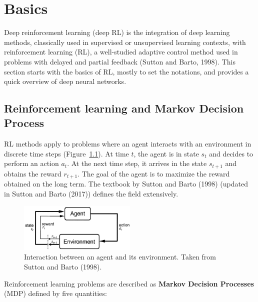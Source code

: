 \documentclass[
  letterpaper,
  DIV=11,
  numbers=noendperiod]{scrreprt}
\begin{document}
\hypertarget{basics}{%
\chapter{Basics}\label{basics}}

Deep reinforcement learning (deep RL) is the integration of deep
learning methods, classically used in supervised or unsupervised
learning contexts, with reinforcement learning (RL), a well-studied
adaptive control method used in problems with delayed and partial
feedback (Sutton and Barto, 1998). This section starts with the basics
of RL, mostly to set the notations, and provides a quick overview of
deep neural networks.

\hypertarget{reinforcement-learning-and-markov-decision-process}{%
\section{Reinforcement learning and Markov Decision
Process}\label{reinforcement-learning-and-markov-decision-process}}

RL methods apply to problems where an agent interacts with an
environment in discrete time steps (Figure~\ref{fig-agentenv}). At time
\(t\), the agent is in state \(s_t\) and decides to perform an action
\(a_t\). At the next time step, it arrives in the state \(s_{t+1}\) and
obtains the reward \(r_{t+1}\). The goal of the agent is to maximize the
reward obtained on the long term. The textbook by Sutton and Barto
(1998) (updated in Sutton and Barto (2017)) defines the field
extensively.

\begin{figure}

{\centering \includegraphics[width=0.5\textwidth,height=\textheight]{./img/rl-agent.jpg}

}

\caption{\label{fig-agentenv}Interaction between an agent and its
environment. Taken from Sutton and Barto (1998).}

\end{figure}

Reinforcement learning problems are described as \textbf{Markov Decision
Processes} (MDP) defined by five quantities:
\end{document}
